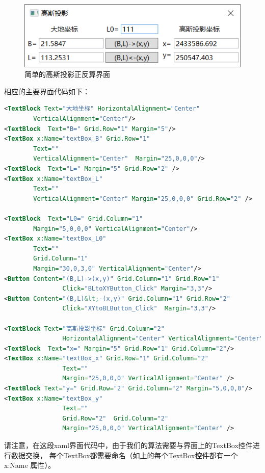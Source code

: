 \begin{figure}[htbp]
    \centering
    \includegraphics[scale=1]{chapter/gaussProj/UI01.png}
    \caption{简单的高斯投影正反算界面}
    \label{fig:GaussProjUI01}
\end{figure}

相应的主要界面代码如下：

\begin{lstlisting}[language=xml]
<TextBlock Text="大地坐标" HorizontalAlignment="Center"
        VerticalAlignment="Center"/>
<TextBlock  Text="B=" Grid.Row="1" Margin="5"/>
<TextBox x:Name="textBox_B" Grid.Row="1"
        Text=""
        VerticalAlignment="Center"  Margin="25,0,0,0"/>
<TextBlock  Text="L=" Margin="5" Grid.Row="2" />
<TextBox x:Name="textBox_L"
        Text=""
        VerticalAlignment="Center" Margin="25,0,0,0" Grid.Row="2" />

<TextBlock  Text="L0=" Grid.Column="1"
        Margin="5,0,0,0" VerticalAlignment="Center"/>
<TextBox x:Name="textBox_L0"
        Text=""
        Grid.Column="1"
        Margin="30,0,3,0" VerticalAlignment="Center"/>
<Button Content="(B,L)->(x,y)" Grid.Column="1" Grid.Row="1"
                Click="BLtoXYButton_Click" Margin="3,3"/>
<Button Content="(B,L)&lt;-(x,y)" Grid.Column="1" Grid.Row="2"
                Click="XYtoBLButton_Click"  Margin="3,3"/>
        
<TextBlock Text="高斯投影坐标" Grid.Column="2"
                HorizontalAlignment="Center" VerticalAlignment="Center"/>
<TextBlock  Text="x=" Margin="5" Grid.Row="1" Grid.Column="2"/>
<TextBox x:Name="textBox_x" Grid.Row="1" Grid.Column="2"
                Text=""
                Margin="25,0,0,0" VerticalAlignment="Center" />
<TextBlock Text="y=" Grid.Row="2" Grid.Column="2" Margin="5,0,0,0"/>
<TextBox x:Name="textBox_y"
                Text=""
                Grid.Row="2"  Grid.Column="2"
                Margin="25,0,0,0" VerticalAlignment="Center" />       
\end{lstlisting}

请注意，在这段xaml界面代码中，由于我们的算法需要与界面上的TextBox控件进行数据交换，
每个TextBox都需要命名（如上的每个TextBox控件都有一个 x:Name 属性）。

